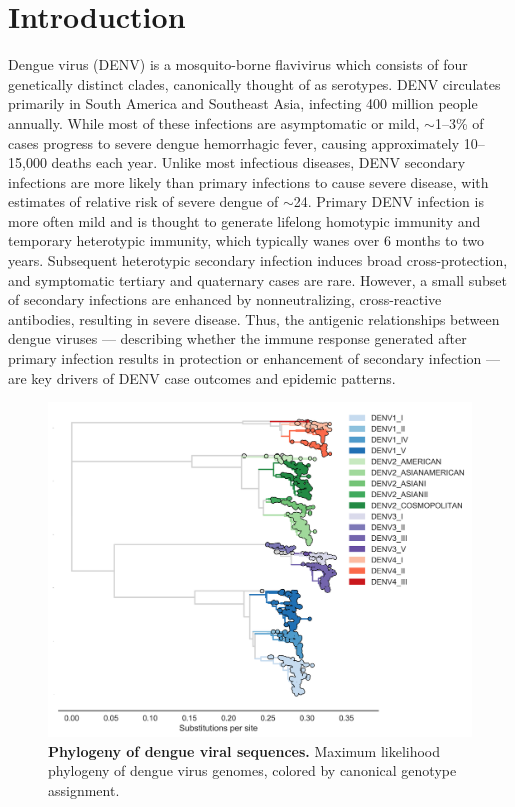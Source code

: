 \documentclass[11pt,oneside,letterpaper]{article}
\begin{document}
\pagebreak

\section*{Introduction}
Dengue virus (DENV) is a mosquito-borne flavivirus which consists of four genetically distinct clades, canonically thought of as serotypes.
DENV circulates primarily in South America and Southeast Asia, infecting 400 million people annually.
While most of these infections are asymptomatic or mild, $\sim$1--3\% of cases progress to severe dengue hemorrhagic fever, causing approximately 10--15,000 deaths each year.
Unlike most infectious diseases, DENV secondary infections are more likely than primary infections to cause severe disease, with estimates of relative risk of severe dengue of $\sim$24.
Primary DENV infection is more often mild and is thought to generate lifelong homotypic immunity and temporary heterotypic immunity, which typically wanes over 6 months to two years.
Subsequent heterotypic secondary infection induces broad cross-protection, and symptomatic tertiary and quaternary cases are rare.
However, a small subset of secondary infections are enhanced by nonneutralizing, cross-reactive antibodies, resulting in severe disease.
Thus, the antigenic relationships between dengue viruses --- describing whether the immune response generated after primary infection results in protection or enhancement of secondary infection --- are key drivers of DENV case outcomes and epidemic patterns.

\begin{figure}[h]
  \begin{centering}
    \includegraphics[width=\linewidth]{../figures/png/genotype_tree.png}
  	\caption{\textbf{Phylogeny of dengue viral sequences.}  Maximum likelihood phylogeny of dengue virus genomes, colored by canonical genotype assignment.}
  	\label{genotype_tree}
  \end{centering}
\end{figure}
\end{document}

